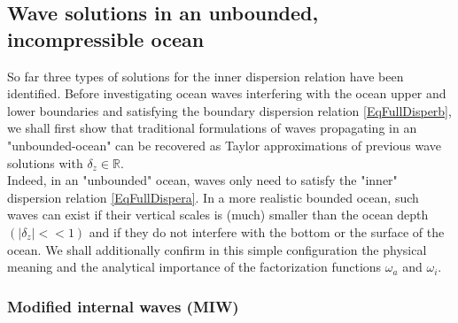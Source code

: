 \documentclass[a4paper,11pt]{article}
\begin{document}
\subsection{Wave solutions in an unbounded, incompressible ocean}
\label{SubSectionUsualDisp}

So far three types of solutions for the inner dispersion relation have been identified. Before investigating ocean waves interfering with the ocean upper and lower boundaries and satisfying the boundary dispersion relation \ref{EqFullDisperb}, we shall first show that traditional formulations of waves propagating in an "unbounded-ocean" can be recovered as Taylor approximations of previous wave solutions with $\delta_z\in\mathbb{R}$.\\
Indeed, in an "unbounded" ocean, waves only need to satisfy the "inner" dispersion relation \ref{EqFullDispera}. In a more realistic bounded ocean, such waves can exist if their vertical scales is (much) smaller than the ocean depth $(|\delta_z| << 1)$ and if they do not interfere with the bottom or the surface of the ocean. 
We shall additionally confirm in this simple configuration the physical meaning and the analytical importance of the factorization functions $\omega_a$ and $\omega_i$. 


\subsubsection{Modified internal waves (MIW)}
\end{document}
